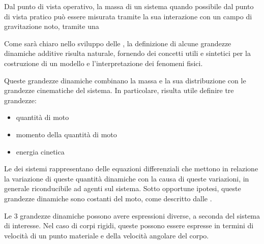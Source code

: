 \documentclass[letterpaper,10pt,italian]{jupyterBook}
\begin{document}
\sphinxAtStartPar
Dal punto di vista operativo, la massa di un sistema \sphinxhyphen{} quando possibile dal punto di vista pratico \sphinxhyphen{} può essere misurata tramite la sua interazione con un campo di gravitazione noto, tramite una 



\sphinxAtStartPar
{}



\sphinxAtStartPar
{}
Come sarà chiaro nello sviluppo delle {\hyperref[\detokenize{ch/mechanics/dynamics-notes:physics-hs-mechanics-dynamics-eom-points}]{}}, la definizione di alcune grandezze dinamiche additive risulta naturale, fornendo dei concetti utili e sintetici per la costruzione di un modello e l’interpretazione dei fenomeni fisici.

\sphinxAtStartPar
Queste grandezze dinamiche combinano la massa e la sua distribuzione con le grandezze cinematiche del sistema. In particolare, risulta utile definire tre grandezze:
\begin{itemize}
\item {} 
\sphinxAtStartPar
quantità di moto

\item {} 
\sphinxAtStartPar
momento della quantità di moto

\item {} 
\sphinxAtStartPar
energia cinetica

\end{itemize}

\sphinxAtStartPar
Le {\hyperref[\detokenize{ch/mechanics/dynamics-eom:physics-hs-mechanics-dynamics-eom}]{}} dei sistemi rappresentano delle equazioni differenziali che mettono in relazione la variazione di queste quantità dinamiche con la causa di queste variazioni, in generale riconducibile ad {\hyperref[\detokenize{ch/mechanics/actions:physics-hs-mechanics-actions}]{}} agenti sul sistema.
Sotto opportune ipotesi, queste grandezze dinamiche sono costanti del moto, come descritto dalle {\hyperref[\detokenize{ch/mechanics/dynamics-conservation:physics-hs-mechanics-dynamics-conservation}]{}}.

\sphinxAtStartPar
Le 3 grandezze dinamiche possono avere espressioni diverse, a seconda del sistema di interesse. Nel caso di corpi rigidi, queste possono essere espresse in termini di velocità di un punto materiale e della velocità angolare del corpo.
\end{document}

